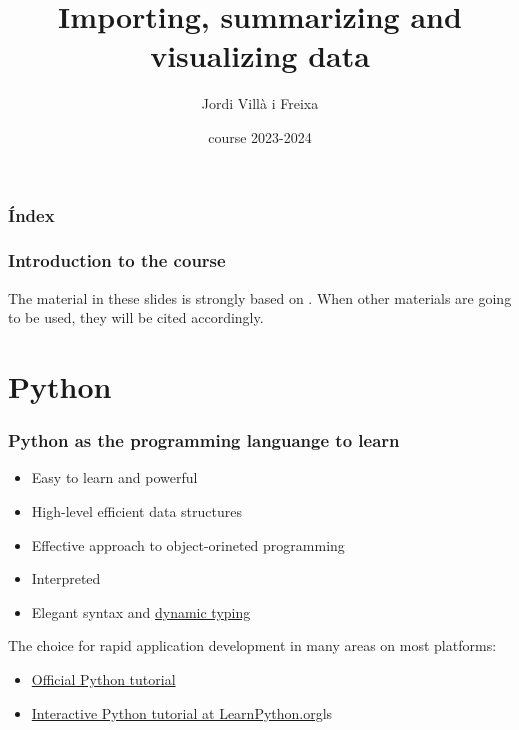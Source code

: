 \documentclass{beamer}
\title[Introduction]{Importing, summarizing and visualizing data} %
\author{Jordi Villà i Freixa} %
\institute[FCTE] %
{
Universitat de Vic - Universitat Central de Catalunya \\
Study Abroad\\ %
\medskip
\textit{jordi.villa@uvic.cat} %
}
\date{course 2023-2024}
\begin{document}
\begin{frame}
\titlepage %
\end{frame}

\begin{frame}
\frametitle{Índex} %
\tableofcontents %
\end{frame}


\begin{frame}
  \frametitle{Introduction to the course}
  The material in these slides is strongly based on \cite{kroese2020}. When other materials are going to be used, they will be cited accordingly.
  \end{frame}


\section{Python} %

\begin{frame}
  \frametitle{Python as the programming languange to learn}
  \begin{itemize}
    \item Easy to learn and powerful
    \item High-level efficient data structures
    \item Effective approach to object-orineted programming
    \item Interpreted
    \item Elegant syntax and \href{https://www.educative.io/answers/what-is-dynamic-typing}{dynamic typing}
  \end{itemize}
  The choice for rapid application development in many areas on most platforms:
  \begin{itemize}
    \item \href{https://docs.python.org/3/tutorial/index.html}{Official Python tutorial}
    \item \href{https://www.learnpython.org}{Interactive Python tutorial at LearnPython.org}ls
  \end{itemize}
\end{frame}
\end{document}
